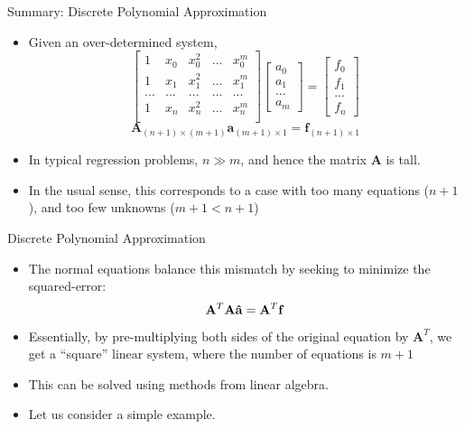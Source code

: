 \documentclass[xcolor=dvipsnames,11pt]{beamer}
\begin{document}
\begin{frame}{Summary: Discrete Polynomial Approximation}
\begin{itemize}
\item Given an over-determined system,
\[
\left[ \begin{array}{ccccc}
1 & x_0 & x_0^2 &... & x_0^m \\
1 & x_1 & x_1^2 & ... & x_1^m \\
... & ... & ... & ... & ... \\
1 & x_{n} & x_{n}^2 & ... & x_{n}^m \\
\end{array} \right]
\left[ \begin{array}{c} a_0 \\ a_1\\ ... \\ a_m \end{array} \right]
=
\left[ \begin{array}{c} f_0 \\ f_1 \\ ... \\ f_{n} \end{array} \right]
\]
$$\boxed{\mathbf{A}_{(n+1) \times (m+1)} \mathbf{a}_{(m+1) \times 1} = \mathbf{f}_{(n+1) \times 1}}$$
\item In typical regression problems, $n \gg m$, and hence the matrix $\mathbf{A}$ is tall.
\item In the usual sense, this corresponds to a case with too many equations ($n+1$), and too few unknowns ($m+1 < n+1$)
\end{itemize}
\end{frame}


\begin{frame}{Discrete Polynomial Approximation}
\begin{itemize}
\item The normal equations balance this mismatch by seeking to minimize the squared-error:
$$\mathbf{A}^T \mathbf{A  \hat{a}} = {\bf A}^T \mathbf{f}$$
\item Essentially, by pre-multiplying both sides of the original equation by $\mathbf{A}^T$, we get a ``square'' linear system, where the number of equations is $m + 1$
\item This can be solved using methods from linear algebra.
\item Let us consider a simple example.
\end{itemize}
\end{frame}
\end{document}
